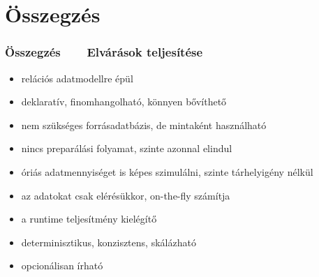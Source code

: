 \documentclass[
    aspectratio=169,
]{beamer}
\newcommand{\slidetitle}[2]{\frametitle{{\small #1 ~ \ding{226} ~ } \normalsize \textbf{#2} }}
\newcommand{\greencheck}{{\color{green!65!black}\ding{51}}}
\begin{document}
\begin{frame}
\end{frame}

\section{Összegzés}
\def\sectionshorttitle{Összegzés}

\begin{frame}
    \slidetitle{\sectionshorttitle}{Elvárások teljesítése}
    
    \begin{itemize}
        \setlength\itemsep{0.5em}
        \item[\greencheck] relációs adatmodellre épül
        \item[\greencheck] deklaratív, finomhangolható, könnyen bővíthető
        \item[\greencheck] nem szükséges forrásadatbázis, de mintaként használható
        \item[\greencheck] nincs preparálási folyamat, szinte azonnal elindul
        \item[\greencheck] óriás adatmennyiséget is képes szimulálni, szinte tárhelyigény nélkül
        \item[\greencheck] az adatokat csak elérésükkor, on-the-fly számítja
        \item[\greencheck] a runtime teljesítmény kielégítő
        \item[\greencheck] determinisztikus, konzisztens, skálázható
        \item[\greencheck] opcionálisan írható
    \end{itemize}
\end{frame}
\end{document}
